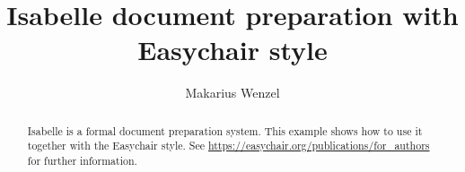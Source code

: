 \documentclass[a4paper,11pt]{easychair}
\begin{document}
\title{Isabelle document preparation with Easychair style}
\author{Makarius Wenzel}
\maketitle

\begin{abstract}
Isabelle is a formal document preparation system. This example shows how to
use it together with the Easychair style. See
\url{https://easychair.org/publications/for_authors} for further information.
\end{abstract}





\end{document}
